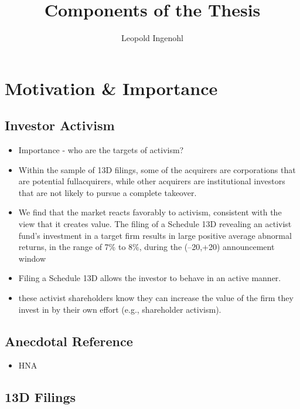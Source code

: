 \documentclass[12pt]{article}
\title{Components of the Thesis}
\author{Leopold Ingenohl}
\begin{document}
\maketitle


\section{Motivation \& Importance} 

\subsection{Investor Activism}

    \begin{itemize}
        \item Importance - who are the targets of activism? \citep{CoffeeJr.2014}
        \item Within the sample of 13D filings, some of the acquirers are corporations that are potential fullacquirers, while other acquirers are institutional investors that are not likely to pursue a complete takeover. \citep{Brigida2012}
        \item We find that the market reacts favorably to activism, consistent with the view that it creates value. The filing of a Schedule 13D revealing an activist fund’s investment in a target firm results in large positive average abnormal returns, in the range of 7\% to 8\%, during the (–20,+20) announcement window \citep{Brav2008}
        \item Filing a Schedule 13D allows the investor to behave in an active manner. \citep{Brigida2012}
        \item these activist shareholders know they can increase the value of the firm they invest in by their own effort (e.g., shareholder activism).\citep{Collin-Dufresne2015}
    \end{itemize}

\subsection{Anecdotal Reference}

    \begin{itemize}
        \item HNA 
    \end{itemize}
\subsection{13D Filings}
\end{document}
